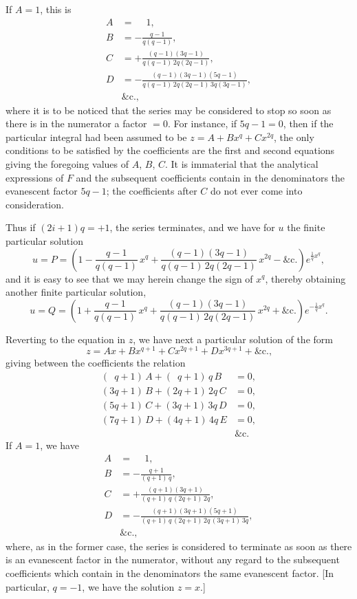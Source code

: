 \documentclass[11pt,a4paper]{article}
\begin{document}
If $A = 1$, this is
\begin{align*}
A &= \phantom{-}1, \\
B &= -\frac{q-1}{q(q-1)}, \\
C &= +\frac{(q-1)(3q-1)}{q(q-1)\,2q(2q-1)}, \\
D &= -\frac{(q-1)(3q-1)(5q-1)}{q(q-1)\,2q(2q-1)\,3q(3q-1)}, \\
&\&\text{c.,}
\end{align*}
where it is to be noticed that the series may be considered to stop so soon as
there is in the numerator a factor $=0$.  For instance, if $5q-1=0$, then if
the particular integral had been assumed to be $z = A + B x^q + C x^{2q}$, the
only conditions to be satisfied by the coefficients are the first and second
equations giving the foregoing values of $A$, $B$, $C$.  It is immaterial that
the analytical expressions of $F$ and the subsequent coefficients contain in
the denominators the evanescent factor $5q-1$; the coefficients after $C$ do
not ever come into consideration.

Thus if $(2i+1)q = +1$, the series terminates, and we have for $u$ the finite
particular solution
\[
u = P = \left(1 - \frac{q-1}{q(q-1)}\,x^q
+ \frac{(q-1)(3q-1)}{q(q-1)\,2q(2q-1)}\,x^{2q}
- \&\text{c.}\right) e^{\frac{1}{q}x^q},
\]
and it is easy to see that we may herein change the sign of $x^q$, thereby
obtaining another finite particular solution,
\[
u = Q = \left(1 + \frac{q-1}{q(q-1)}\,x^q
+ \frac{(q-1)(3q-1)}{q(q-1)\,2q(2q-1)}\,x^{2q}
+ \&\text{c.}\right) e^{-\frac{1}{q}x^q}.
\]

Reverting to the equation in $z$, we have next a particular solution of the
form
\[
z = A x + B x^{q+1} + C x^{2q+1} + D x^{3q+1} + \&\text{c.,}
\]
giving between the coefficients the relation
\begin{align*}
(\phantom{1}q+1)\,A + (\phantom{1}q+1)\,q\,B &= 0, \\
(3q+1)\,B + (2q+1)\,2q\,C &= 0, \\
(5q+1)\,C + (3q+1)\,3q\,D &= 0, \\
(7q+1)\,D + (4q+1)\,4q\,E &= 0, \\
&\&\text{c.}
\end{align*}
If $A = 1$, we have
\begin{align*}
A &= \phantom{-}1, \\
B &= -\frac{q+1}{(q+1)\,q}, \\
C &= +\frac{(q+1)(3q+1)}{(q+1)\,q\,(2q+1)\,2q}, \\
D &= -\frac{(q+1)(3q+1)(5q+1)}{(q+1)\,q\,(2q+1)\,2q\,(3q+1)\,3q}, \\
&\&\text{c.,}
\end{align*}
where, as in the former case, the series is considered to terminate as soon as
there is an evanescent factor in the numerator, without any regard to the
subsequent coefficients which contain in the denominators the same evanescent
factor.  [In particular, $q = -1$, we have the solution $z = x$.]
\end{document}

